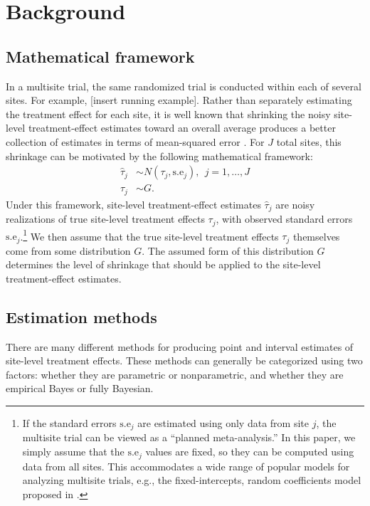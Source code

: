 \documentclass[]{article}
\begin{document}
\section{Background}

\subsection{Mathematical framework}

In a multisite trial, the same randomized trial is conducted within each of several sites.
For example, [insert running example].
Rather than separately estimating the treatment effect for each site, it is well known that shrinking the noisy site-level treatment-effect estimates toward an overall average produces a better collection of estimates in terms of mean-squared error \citep{james1961estimation}.
For $J$ total sites, this shrinkage can be motivated by the following mathematical framework:
\begin{align*}
    \hat{\tau}_j &\sim N(\tau_j, \text{s.e}_j), \ \ j=1,\dots,J \\
    \tau_j &\sim G.
\end{align*}
Under this framework, site-level treatment-effect estimates $\hat{\tau}_j$ are noisy realizations of true site-level treatment effects $\tau_j$, with observed standard errors $\text{s.e}_j$.\footnote{If the standard errors $\text{s.e}_j$ are estimated using only data from site $j$, the multisite trial can be viewed as a ``planned meta-analysis.''
In this paper, we simply assume that the $\text{s.e}_j$ values are fixed, so they can be computed using data from all sites.
This accommodates a wide range of popular models for analyzing multisite trials, e.g., the fixed-intercepts, random coefficients model proposed in \cite{bloom2017using}.}
We then assume that the true site-level treatment effects $\tau_j$ themselves come from some distribution $G$.
The assumed form of this distribution $G$ determines the level of shrinkage that should be applied to the site-level treatment-effect estimates.

\subsection{Estimation methods}

There are many different methods for producing point and interval estimates of site-level treatment effects.
These methods can generally be categorized using two factors: whether they are parametric or nonparametric, and whether they are empirical Bayes or fully Bayesian.
\end{document}
